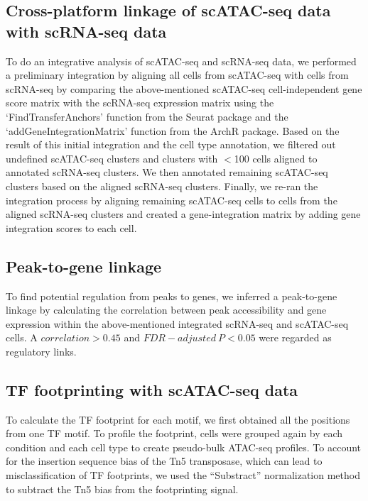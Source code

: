 \documentclass{book}
\begin{document}
\begin{refsection}
\subsection*{Cross-platform linkage of scATAC-seq data with scRNA-seq data}
To do an integrative analysis of scATAC-seq and scRNA-seq data, we performed a preliminary integration by aligning all cells from scATAC-seq with cells from scRNA-seq by comparing the above-mentioned scATAC-seq cell-independent gene score matrix with the scRNA-seq expression matrix using the ‘FindTransferAnchors’ function from the Seurat package and the ‘addGeneIntegrationMatrix’ function from the ArchR package.
Based on the result of this initial integration and the cell type annotation, we filtered out undefined scATAC-seq clusters and clusters with $<$100 cells aligned to annotated scRNA-seq clusters.
We then annotated remaining scATAC-seq clusters based on the aligned scRNA-seq clusters.
Finally, we re-ran the integration process by aligning remaining scATAC-seq cells to cells from the aligned scRNA-seq clusters and created a gene-integration matrix by adding gene integration scores to each cell.

\subsection*{Peak-to-gene linkage}
To find potential regulation from peaks to genes, we inferred a peak-to-gene linkage by calculating the correlation between peak accessibility and gene expression within the above-mentioned integrated scRNA-seq and scATAC-seq cells.
A $correlation > 0.45$ and $FDR-adjusted~P < 0.05$ were regarded as regulatory links.

\subsection*{TF footprinting with scATAC-seq data}
To calculate the TF footprint for each motif, we first obtained all the positions from one TF motif.
To profile the footprint, cells were grouped again by each condition and each cell type to create pseudo-bulk ATAC-seq profiles.
To account for the insertion sequence bias of the Tn5 transposase, which can lead to misclassification of TF footprints, we used the “Substract” normalization method to subtract the Tn5 bias from the footprinting signal.


\end{refsection}
\end{document}
